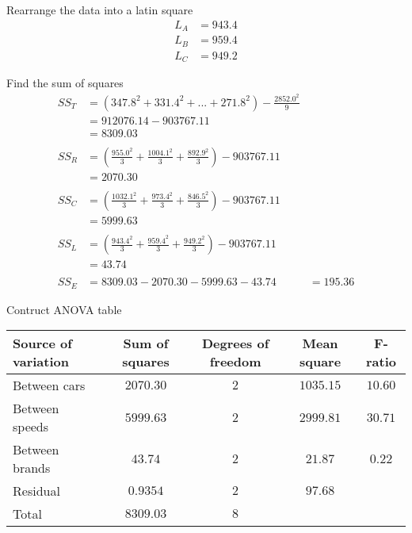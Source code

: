 \begin{example}
\begin{step}{Rearrange the data into a latin square}
        \begin{align*}
        L_A &= 943.4\\
        L_B &= 959.4\\
        L_C &= 949.2
        \end{align*}
        \end{step}

        \begin{step}{Find the sum of squares}
        \begin{align*}
        SS_T &= (347.8^2 + 331.4^2 + ... + 271.8^2) - \frac{2852.0^2}{9}\\
        &= 912076.14 - 903767.11\\
        &= 8309.03\\
        \\
        SS_R &= (\frac{955.0^2}{3} + \frac{1004.1^2}{3} + \frac{892.9^2}{3}) - 903767.11\\
        &= 2070.30\\
        \\
        SS_C &= (\frac{1032.1^2}{3} + \frac{973.4^2}{3} + \frac{846.5^2}{3}) - 903767.11\\
        &= 5999.63\\
        \\
        SS_L &= (\frac{943.4^2}{3} + \frac{959.4^2}{3} + \frac{949.2^2}{3}) - 903767.11\\
        &= 43.74\\
        \\
        SS_E &= 8309.03 - 2070.30 - 5999.63 - 43.74
        &= 195.36
        \end{align*}
        \end{step}

        \begin{step}{Contruct ANOVA table}
        \begin{center}
        \begin{tabular}{l|c|c|c|c}
        Source of variation & Sum of squares    & Degrees of freedom    & Mean square   & F-ratio       \\
        \hline
        Between cars        & $2070.30$         & $2$                   & $1035.15$     & $10.60$       \\
        Between speeds      & $5999.63$         & $2$                   & $2999.81$     & $30.71$       \\
        Between brands      & $43.74$           & $2$                   & $21.87$       & $0.22$        \\
        Residual            & $0.9354$          & $2$                   & $97.68$       &               \\
        \hline
        Total               & $8309.03$         & $8$                   &               &               \\
        \end{tabular}
        \end{center}
        \end{step}


\end{example}
